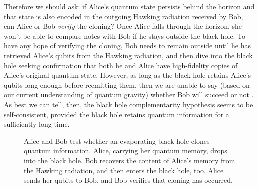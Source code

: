 \documentclass[12pt]{article}
\begin{document}
Therefore we should ask: if Alice's quantum state persists behind the horizon and that state is also encoded in the outgoing Hawking radiation received by Bob, can Alice or Bob {\em verify} the cloning? Once Alice falls through the horizon, she won't be able to compare notes with Bob if he stays outside the black hole. To have any hope of verifying the cloning, Bob needs to remain outside until he has retrieved Alice's qubits from the Hawking radiation, and then dive into the black hole seeking confirmation that both he and Alice have high-fidelity copies of Alice's original quantum state. However, as long as the black hole retains Alice's qubits long enough before reemitting them, then we are unable to say (based on our current understanding of quantum gravity) whether Bob will succeed or not \cite{susskind-gedanken,preskill-unpublished}. As best we can tell, then, the black hole complementarity hypothesis seems to be self-consistent, provided the black hole retains quantum information for a sufficiently long time.

\begin{figure}
\begin{center}
\leavevmode
\epsfxsize=4.5in
\end{center}
\caption{Alice and Bob test whether an evaporating black hole clones quantum information. Alice, carrying her quantum memory, drops into the black hole. Bob recovers the content of Alice's memory from the Hawking radiation, and then enters the black hole, too. Alice sends her qubits to Bob, and Bob verifies that cloning has occurred.}
\label{fig:cloning}
\end{figure}
\end{document}
